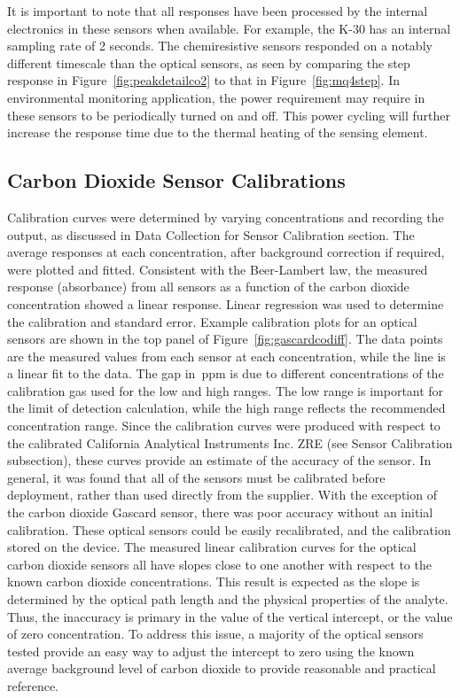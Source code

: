 \documentclass[times]{joehreview}
\begin{document}
	It is important to note that all responses have been processed by the internal electronics in these sensors when available.  For example, the K-30 has an internal sampling rate of 2 seconds.  The chemiresistive sensors responded on a notably different timescale than the optical sensors, as seen by comparing the step response in Figure~\ref{fig:peakdetailco2} to that in Figure~\ref{fig:mq4step}.  In environmental monitoring application, the power requirement may require in these sensors to be periodically turned on and off.  This power cycling will further increase the response time due to the thermal heating of the sensing element.  
	
	\subsection*{ Carbon Dioxide Sensor Calibrations}
	\label{sec:main_cal}
	
	Calibration curves were determined by varying concentrations and recording the output, as discussed in Data Collection for Sensor Calibration section.  
	The average responses at each concentration, after background correction if required, were plotted and fitted.  Consistent with the Beer-Lambert law, the measured response (absorbance) from all sensors as a function of the carbon dioxide concentration showed a linear response.  Linear regression was used to determine the calibration and standard error.  Example calibration plots for an optical sensors are shown in the top panel of Figure~\ref{fig:gascardcodiff}. The data points are the measured values from each sensor at each concentration, while the line is a linear fit to the data.  The gap in~ppm is due to different concentrations of the calibration gas used for the low and high ranges.  The low range is important for the limit of detection calculation, while the high range reflects the recommended concentration range.  Since the calibration curves were produced with respect to the calibrated California Analytical Instruments Inc. ZRE (see Sensor Calibration subsection), these curves provide an estimate of the accuracy of the sensor.  In general, it was found that all of the sensors must be calibrated before deployment, rather than used directly from the supplier.  With the exception of the carbon dioxide Gascard sensor, there was poor accuracy without an initial calibration.  These optical sensors could be easily recalibrated, and the calibration stored on the device.  The measured linear calibration curves for the optical carbon dioxide sensors all have slopes close to one another with respect to the known carbon dioxide concentrations.  This result is expected as the slope is determined by the optical path length and the physical properties of the analyte.  Thus, the inaccuracy is primary in the value of the vertical intercept, or the value of zero concentration.  To address this issue, a majority of the optical sensors tested provide an easy way to adjust the intercept to zero using the known average background level of carbon dioxide to provide reasonable and practical reference.
	
\end{document}

